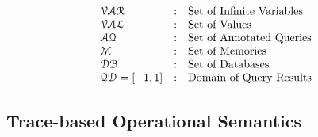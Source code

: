 \documentclass[a4paper,11pt]{article}
\begin{document}
%
\[
\begin{array}{lll}
\mathcal{VAR} & : & \mbox{Set of Infinite Variables}  
\\ 
%
\mathcal{VAL} & : & \mbox{Set of Values} 
\\ 
%
 \mathcal{AQ}  & : & \mbox{Set of Annotated Queries}  
\\
%
\memdom  & : & \mbox{{Set of Memories}} 
\\
%
\dbdom  & : & \mbox{{Set of Databases}} 
\\
%
\qdom = {[-1,1]} & : & \mbox{{Domain of Query Results}}
\end{array}
\]
%
%
\subsection{ Trace-based Operational Semantics}
\end{document}
